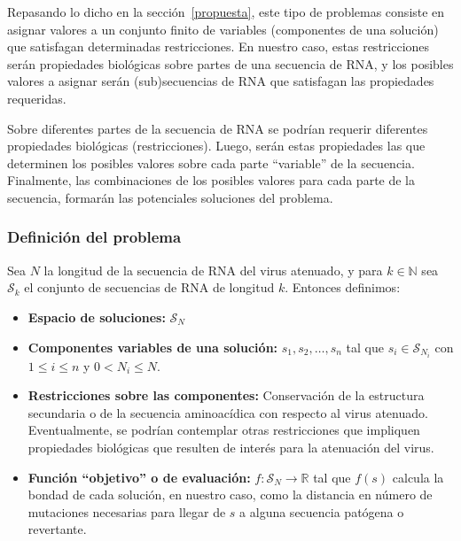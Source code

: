 Repasando lo dicho en la secci\'on~\ref{propuesta}, este tipo de problemas
consiste en asignar valores a un conjunto finito de variables (componentes de
una soluci\'on) que satisfagan determinadas restricciones. En nuestro caso,
estas restricciones ser\'an propiedades biol\'ogicas sobre partes de una
secuencia de \ac{RNA}, y los posibles valores a asignar ser\'an (sub)secuencias
de \ac{RNA} que satisfagan las propiedades requeridas.

Sobre diferentes partes de la secuencia de \ac{RNA} se podr\'ian requerir
diferentes propiedades biol\'ogicas (restricciones). Luego, ser\'an estas
propiedades las que determinen los posibles valores sobre cada parte
``variable'' de la secuencia. Finalmente, las combinaciones de los posibles
valores para cada parte de la secuencia, formar\'an las potenciales soluciones
del problema.

\subsubsection{Definici\'on del problema}

Sea $N$ la longitud de la secuencia de \ac{RNA} del virus atenuado, y para $k
\in \mathbb{N}$ sea $\mathcal{S}_{k}$ el conjunto de secuencias de \ac{RNA} de
longitud $k$. Entonces definimos:

\begin{itemize} 
 \item \textbf{Espacio de soluciones:} $\mathcal{S}_{N}$

 \item \textbf{Componentes variables de una soluci\'on:} $s_{1},s_{2}, \dots,
s_{n}$ tal que $s_{i} \in \mathcal{S}_{N_{i}}$ con $1 \le i \le n$ y $0 < N_{i}
\le N$.

 \item \textbf{Restricciones sobre las componentes:} Conservaci\'on de la
estructura secundaria o de la secuencia aminoac\'idica con respecto al virus
atenuado. Eventualmente, se podr\'ian contemplar otras restricciones que
impliquen propiedades biol\'ogicas que resulten de inter\'es para la
atenuaci\'on del virus.

 \item \textbf{Funci\'on ``objetivo'' o de evaluaci\'on:} $f: \mathcal{S}_{N}
\rightarrow \mathbb{R}$ tal que $f(s)$ calcula la bondad de cada soluci\'on, en
nuestro caso, como la distancia en n\'umero de mutaciones necesarias para
llegar de $s$ a alguna secuencia pat\'ogena o revertante.
\end{itemize}

